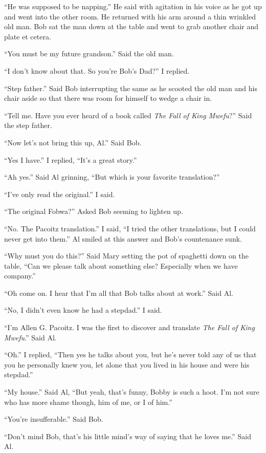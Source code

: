 ``He was supposed to be napping.'' He said with agitation in his voice as he got up and went into the other room. He returned with his arm around a thin wrinkled old man. Bob sat the man down at the table and went to grab another chair and plate et cetera.

``You must be my future grandson.'' Said the old man.

``I don't know about that. So you're Bob's Dad?'' I replied.

``Step father.'' Said Bob interrupting the same as he scooted the old man and his chair aside so that there was room for himself to wedge a chair in.

``Tell me. Have you ever heard of a book called \emph{The Fall of King Mwefu}?'' Said the step father.

``Now let's not bring this up, Al.'' Said Bob.

``Yes I have.'' I replied, ``It's a great story.''

``Ah yes.'' Said Al grinning, ``But which is your favorite translation?''

``I've only read the original.'' I said.

``The original Fobwa?'' Asked Bob seeming to lighten up.

``No. The Pacoitz translation.'' I said, ``I tried the other translations, but I could never get into them.'' Al smiled at this answer and Bob's countenance sunk.

``Why must you do this?'' Said Mary setting the pot of spaghetti down on the table, ``Can we please talk about something else? Especially when we have company.''

``Oh come on. I hear that I'm all that Bob talks about at work.'' Said Al.

``No, I didn't even know he had a stepdad.'' I said.

``I'm Allen G. Pacoitz. I was the first to discover and translate \emph{The Fall of King Mwefu}.'' Said Al.

``Oh.'' I replied, ``Then yes he talks about you, but he's never told any of us that you he personally knew you, let alone that you lived in his house and were his stepdad.''

``My house.'' Said Al, ``But yeah, that's funny, Bobby is such a hoot. I'm not sure who has more shame though, him of me, or I of him.''

``You're insufferable.'' Said Bob.

``Don't mind Bob, that's his little mind's way of saying that he loves me.'' Said Al.

